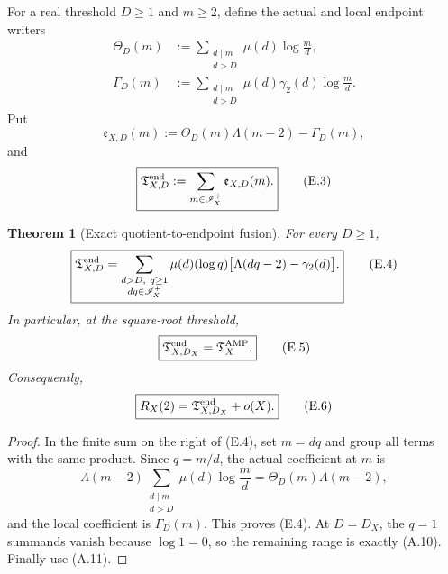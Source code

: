\documentclass[11pt]{article}
\newtheorem{theorem}{Theorem}[section]
\theoremstyle{definition}
\theoremstyle{remark}
\begin{document}
For a real threshold $D\ge1$ and $m\ge2$, define the actual and local
endpoint writers
\begin{equation}
 \label{eq:affend-endpoint-writers}
 \boxed{
 \begin{aligned}
 \Theta_D(m)
 &:=\sum_{\substack{d\mid m\\d>D}}
     \mu(d)\log\frac md,\\
 \Gamma_D(m)
 &:=\sum_{\substack{d\mid m\\d>D}}
     \mu(d)\gamma_2(d)\log\frac md.
 \end{aligned}}
 \tag{E.1}
\end{equation}
Put
\begin{equation}
 \label{eq:affend-endpoint-row}
 \boxed{
 \mathfrak e_{X,D}(m)
 :=\Theta_D(m)\Lambda(m-2)-\Gamma_D(m),}
 \tag{E.2}
\end{equation}
and
\begin{equation}
 \label{eq:affend-endpoint-packet}
 \boxed{
 \mathfrak T_{X,D}^{\rm end}
 :=\sum_{m\in\mathscr I_X^+}\mathfrak e_{X,D}(m).}
 \tag{E.3}
\end{equation}

\begin{theorem}[Exact quotient-to-endpoint fusion]
\label{thm:affend-endpoint-fusion}
For every $D\ge1$,
\begin{equation}
 \label{eq:affend-fusion-identity}
 \boxed{
 \mathfrak T_{X,D}^{\rm end}
 =\sum_{\substack{d>D,\ q\ge1\\dq\in\mathscr I_X^+}}
   \mu(d)(\log q)
   \bigl[\Lambda(dq-2)-\gamma_2(d)\bigr].}
 \tag{E.4}
\end{equation}
In particular, at the square-root threshold,
\begin{equation}
 \label{eq:affend-affouter-equivalence}
 \boxed{
 \mathfrak T_{X,D_X}^{\rm end}
 =\mathfrak T_X^{\rm AMP}.}
 \tag{E.5}
\end{equation}
Consequently,
\begin{equation}
 \label{eq:affend-residual-endpoint}
 \boxed{
 R_X(2)
 =\mathfrak T_{X,D_X}^{\rm end}+o(X).}
 \tag{E.6}
\end{equation}
\end{theorem}

\begin{proof}
In the finite sum on the right of \textup{(E.4)}, set $m=dq$ and group all
terms with the same product.  Since $q=m/d$, the actual coefficient at $m$ is
\[
 \Lambda(m-2)
 \sum_{\substack{d\mid m\\d>D}}
 \mu(d)\log\frac md
 =\Theta_D(m)\Lambda(m-2),
\]
and the local coefficient is $\Gamma_D(m)$.  This proves
\textup{(E.4)}.  At $D=D_X$, the $q=1$ summands vanish because
$\log1=0$, so the remaining range is exactly \textup{(A.10)}.  Finally use \textup{(A.11)}.
\end{proof}
\end{document}
